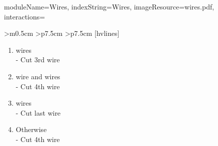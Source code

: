\documentclass{../../ktane-mod}
\begin{document}
\begin{module}{
  moduleName=Wires,
  indexString=Wires,
  imageResource=wires.pdf,
  interactions=\keysymbol
}
\begin{NiceTabular}{
    >{\centering\arraybackslash}m{0.5cm}
    >{\centering\arraybackslash}p{7.5cm}
    >{\centering\arraybackslash}p{7.5cm}
  }[hvlines]
\begin{minipage}[c][4cm][t]{\linewidth}
\begin{enumerate}[label=\alph*.,itemsep=0pt]
                         \item \YELLOW[No YELLOW] wires\\ - Cut 3rd wire
                         \item \YELLOW[1 YELLOW] wire and \WHITE[2+ WHITE] wires\\ - Cut 4th wire
                         \item \RED[No RED] wires\\ - Cut last wire
                         \item Otherwise\\ - Cut 4th wire
                       \end{enumerate}
    \end{minipage} \\
  \end{NiceTabular}
  \renewcommand{\arraystretch}{1.0}
\end{module}
\end{document}

